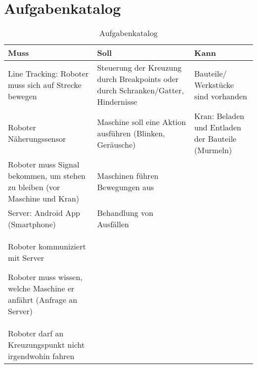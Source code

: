 \chapter{Aufgabenkatalog}
\label{ch:Aufgabenkatalog}

\begin{table}[h]
	\centering
	\caption{Aufgabenkatalog}
	\label{tab:Aufgabenkatalogtable}
	\begin{tabular}{p{4.8cm}p{4.8cm}p{4.8cm}}
		\toprule
		Muss & Soll & Kann\\
		\midrule
		Line Tracking: Roboter muss sich auf Strecke bewegen 
		& Steuerung der Kreuzung durch Breakpoints
		oder durch Schranken/Gatter, Hindernisse 
		& Bauteile/ Werkstücke sind vorhanden\\		
		Roboter Näherungssensor 
		& Maschine soll eine Aktion ausführen (Blinken, Geräusche)
		& Kran: Beladen und Entladen der Bauteile (Murmeln)\\		
		Roboter muss Signal bekommen, um stehen zu bleiben (vor Maschine und Kran) 
		& Maschinen führen Bewegungen aus\\		
		Server: Android App (Smartphone) 
		& Behandlung von Ausfällen\\		
		Roboter kommuniziert mit Server

 
		Roboter muss wissen, welche Maschine er anfährt 
		(Anfrage an Server) \\		
		Roboter darf an Kreuzungspunkt nicht irgendwohin fahren \\ 
		\bottomrule
	\end{tabular}
\end{table}

